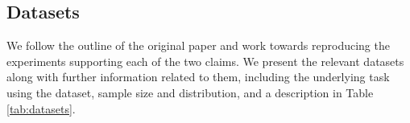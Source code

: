 

\subsection{Datasets}
We follow the outline of the original paper and work towards reproducing the experiments supporting each of the two claims. We present the relevant datasets along with further information related to them, including the underlying task using the dataset, sample size and distribution, and a description in Table \ref{tab:datasets}.

\begin{table}[H]
    \centering
    \caption{Summary of the datasets used in our experimentation. For each of the tasks, the following train/test ratios are used: \textbf{Node Classification}: 0.5 (Rice), \textbf{Link Prediction}: 0.1 (Rice Twitter), \textbf{Influence Maximization}: n/a (Rice 2,3-Grouped Synthetic, Twitter).}
    \label{tab:datasets}
\end{table}

